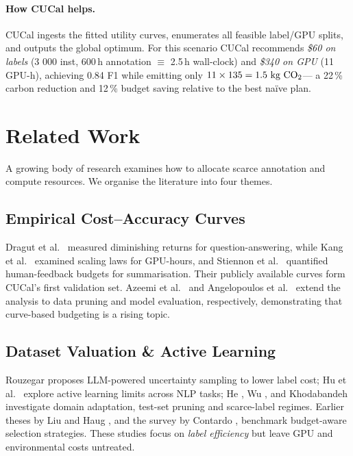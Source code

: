 \documentclass[11pt]{article}
\begin{document}
\paragraph{How CUCal helps.}
CUCal ingests the fitted utility curves, enumerates all feasible
label/GPU splits, and outputs the global optimum.
For this scenario CUCal recommends
\emph{\$60 on labels} (3 000 inst, 600\,h annotation $\equiv$ 2.5\,h 
wall-clock) and
\emph{\$340 on GPU} (11 GPU-h),
achieving 0.84 F1 while emitting only
$11\times135=1.5\text{ kg CO\textsubscript{2}}$—
a 22\,\% carbon reduction and 12\,\% budget saving
relative to the best naïve plan.

\section{Related Work}

A growing body of research examines how to allocate scarce annotation and
compute resources.  We organise the literature into four themes.

\subsection{Empirical Cost--Accuracy Curves}
Dragut et al.~\citeyearpar{Dragut2019} measured diminishing returns for
question-answering, while Kang et al.~\citeyearpar{Kang2023} examined scaling
laws for GPU-hours, and Stiennon et al.~\citeyearpar{Stiennon2021}
quantified human-feedback budgets for summarisation.  
Their publicly available curves form CUCal’s first validation set.  
Azeemi et al.~\citeyearpar{Azeemi2024} and
Angelopoulos et al.~\citeyearpar{Angelopoulos2025} extend the analysis to
data pruning and model evaluation, respectively, demonstrating that
curve-based budgeting is a rising topic.

\subsection{Dataset Valuation \& Active Learning}
Rouzegar \citeyearpar{Rouzegar2024} proposes LLM-powered uncertainty
sampling to lower label cost; Hu et al.~\citeyearpar{Hu2021} explore active
learning limits across NLP tasks; He \citeyearpar{He2024},
Wu \citeyearpar{Wu2024}, and Khodabandeh \citeyearpar{Khodabandeh2023}
investigate domain adaptation, test-set pruning and scarce-label regimes.
Earlier theses by Liu \citeyearpar{Liu2019} and
Haug \citeyearpar{Haug2021}, and the survey by
Contardo \citeyearpar{Contardo2017}, benchmark budget-aware selection
strategies.
These studies focus on \emph{label efficiency} but leave GPU and
environmental costs untreated.
\end{document}
